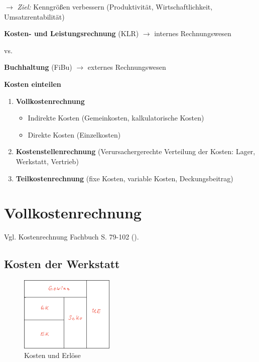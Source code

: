 $\to$ \emph{Ziel:} Kenngrößen verbessern (Produktivität,
Wirtschaftlichkeit, Umsatzrentabilität)

\textbf{Kosten- und Leistungsrechnung} (KLR) $\to$ internes
Rechnungswesen

vs.

\textbf{Buchhaltung} (FiBu) $\to$ externes Rechnungswesen

\textbf{Kosten einteilen}

\begin{enumerate}
\item
  \textbf{Vollkostenrechnung}

  \begin{itemize}
  \item
    Indirekte Kosten (Gemeinkosten, kalkulatorische Kosten)
  \item
    Direkte Kosten (Einzelkosten)
  \end{itemize}
\item
  \textbf{Kostenstellenrechnung} (Verursachergerechte Verteilung der
  Kosten: Lager, Werkstatt, Vertrieb)
\item
  \textbf{Teilkostenrechnung} (fixe Kosten, variable Kosten,
  Deckungsbeitrag)
\end{enumerate}

\section{Vollkostenrechnung}\label{vollkostenrechnung}

Vgl. Kostenrechnung Fachbuch S. 79-102
(\textcite{heiser:2017:betriebsfuhrung}).

\subsection{Kosten der Werkstatt}\label{kosten-der-werkstatt}

\begin{figure}[!ht]%
\centering
\includegraphics[width=0.4\textwidth]{images/Skizze/02_Umsatzerloese_Skizze.pdf}
\caption{Kosten und Erlöse}
\end{figure}

